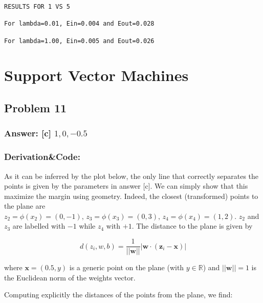 \documentclass[11pt]{article}
\begin{document}
    \begin{Verbatim}[commandchars=\\\{\}]
RESULTS FOR 1 VS 5

For lambda=0.01, Ein=0.004 and Eout=0.028

For lambda=1.00, Ein=0.005 and Eout=0.026

    \end{Verbatim}

    \hypertarget{support-vector-machines}{%
\section{Support Vector Machines}\label{support-vector-machines}}

\hypertarget{problem-11}{%
\subsection{Problem 11}\label{problem-11}}

\hypertarget{answer-c-10-0.5}{%
\subsubsection{\texorpdfstring{Answer: {[}c{]}
\(1,0,-0.5\)}{Answer: {[}c{]} 1,0,-0.5}}\label{answer-c-10-0.5}}

\hypertarget{derivationcode}{%
\subsubsection{Derivation\&Code:}\label{derivationcode}}

As it can be inferred by the plot below, the only line that correctly
separates the points is given by the parameters in answer {[}c{]}. We
can simply show that this maximize the margin using geometry. Indeed,
the closest (transformed) points to the plane are
\(z_2=\phi(x_2)=(0,-1), \,z_3=\phi(x_3)=(0,3),\, z_4=\phi(x_4)=(1,2)\).
\(z_2\) and \(z_3\) are labelled with \(-1\) while \(z_4\) with \(+1\).
The distance to the plane is given by

\begin{equation}
d(z_i,w,b)=\frac{1}{||\mathbf{w}||}|\mathbf{w}\cdot(\mathbf{z}_i-\mathbf{x})|
\end{equation}

where \(\mathbf{x}=(0.5,y)\) is a generic point on the plane (with
\(y\in\mathbb{R}\)) and \(||\mathbf{w}||=1\) is the Euclidean norm of
the weights vector.

Computing explicitly the distances of the points from the plane, we
find:
\end{document}

